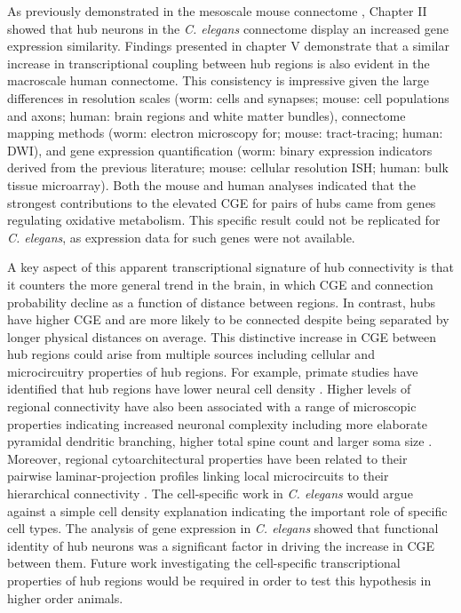 As previously demonstrated in the mesoscale mouse connectome \citep{Fulcher2016}, Chapter II showed that hub neurons in the \textit{C. elegans} connectome display an increased gene expression similarity. Findings presented in chapter V demonstrate that a similar increase in transcriptional coupling between hub regions is also evident in the macroscale human connectome. This consistency is impressive given the large differences in resolution scales (worm: cells and synapses; mouse: cell populations and axons; human: brain regions and white matter bundles), connectome mapping methods (worm: electron microscopy for; mouse: tract-tracing; human: DWI), and gene expression quantification (worm: binary expression indicators derived from the previous literature; mouse: cellular resolution ISH; human: bulk tissue microarray). Both the mouse and human analyses indicated that the strongest contributions to the elevated CGE for pairs of hubs came from genes regulating oxidative metabolism. This specific result could not be replicated for \textit{C. elegans}, as expression data for such genes were not available.

A key aspect of this apparent transcriptional signature of hub connectivity is that it counters the more general trend in the brain, in which CGE and connection probability decline as a function of distance between regions. In contrast, hubs have higher CGE and are more likely to be connected despite being separated by longer physical distances on average. This distinctive increase in CGE between hub regions could arise from multiple sources including cellular and microcircuitry properties of hub regions. For example, primate studies have identified that hub regions have lower neural cell density \citep{Beul2017,Scholtens2014}. Higher levels of regional connectivity have also been associated with a range of microscopic properties indicating increased neuronal complexity including more elaborate pyramidal dendritic branching, higher total spine count and larger soma size \citep{Scholtens2014}. Moreover, regional cytoarchitectural properties have been related to their pairwise laminar-projection profiles linking local microcircuits to their hierarchical connectivity \citep{Barbas}. The cell-specific work in \textit{C. elegans} would argue against a simple cell density explanation indicating the important role of specific cell types. The analysis of gene expression in \textit{C. elegans} showed that functional identity of hub neurons was a significant factor in driving the increase in CGE between them. Future work investigating the cell-specific transcriptional properties of hub regions would be required in order to test this hypothesis in higher order animals. 


